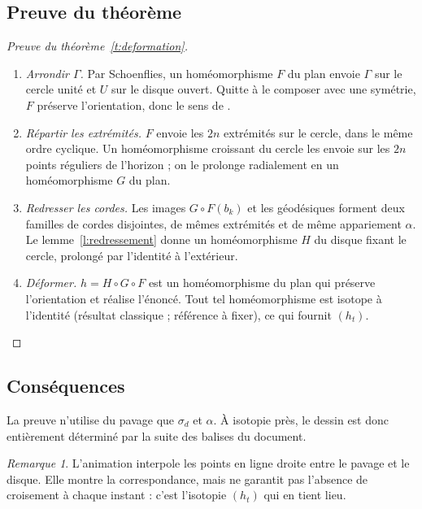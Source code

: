 \documentclass[11pt,a4paper]{article}
\theoremstyle{remark}
\newtheorem*{remarque}{Remarque}
\begin{document}
\subsection{Preuve du théorème}

\begin{proof}[Preuve du théorème~\ref{t:deformation}]
\leavevmode
\begin{enumerate}[label=\arabic*.]
  \item \emph{Arrondir $\Gamma$.} Par Schoenflies, un homéomorphisme $F$ du plan
    envoie $\Gamma$ sur le cercle unité et $U$ sur le disque ouvert. Quitte à le
    composer avec une symétrie, $F$ préserve l'orientation, donc le sens de
    \spin.
  \item \emph{Répartir les extrémités.} $F$ envoie les $2n$ extrémités sur le
    cercle, dans le même ordre cyclique. Un homéomorphisme croissant du cercle
    les envoie sur les $2n$ points réguliers de l'horizon ; on le prolonge
    radialement en un homéomorphisme $G$ du plan.
  \item \emph{Redresser les cordes.} Les images $G\circ F(b_k)$ et les
    géodésiques forment deux familles de cordes disjointes, de mêmes extrémités
    et de même appariement $\alpha$. Le lemme~\ref{l:redressement} donne un
    homéomorphisme $H$ du disque fixant le cercle, prolongé par l'identité à
    l'extérieur.
  \item \emph{Déformer.} $h=H\circ G\circ F$ est un homéomorphisme du plan qui
    préserve l'orientation et réalise l'énoncé. Tout tel homéomorphisme est
    isotope à l'identité (résultat classique ; référence à fixer), ce qui
    fournit $(h_t)$.\qedhere
\end{enumerate}
\end{proof}

\subsection{Conséquences}

La preuve n'utilise du pavage que $\sigma_d$ et $\alpha$. À isotopie près, le
dessin est donc entièrement déterminé par la suite des balises du document.

\begin{remarque}
L'animation interpole les points en ligne droite entre le pavage et le disque.
Elle montre la correspondance, mais ne garantit pas l'absence de croisement à
chaque instant : c'est l'isotopie $(h_t)$ qui en tient lieu.
\end{remarque}
\end{document}
